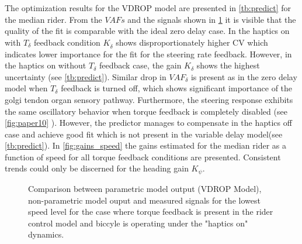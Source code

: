 The optimization results for the VDROP model are presented in \cref{tb:predict} for the median rider. From the \ensuremath{\mathit{VAF}s} and the signals shown in \cref{fig:ropm_raw} it is visible that the quality of the fit is comparable with the ideal zero delay case. In the haptics on with \ensuremath{{T_\delta}} feedback condition \ensuremath{K_{\dot{\delta}}} shows disproportionately higher CV which indicates lower importance for the fit for the steering rate feedback. However, in the haptics on without \ensuremath{ {T_\delta}} feedback case, the gain \ensuremath{K_{\delta}} shows the highest  uncertainty (see \cref{tb:predict}). Similar drop in \ensuremath{\mathit{VAF}_\delta} is present as in the zero delay model when  \ensuremath{{T_\delta}} feedback is turned off, which shows significant importance of the golgi tendon organ sensory pathway. Furthermore, the steering response exhibits  the same oscillatory behavior when torque feedback is completely disabled (see \cref{fig:paper10} ). However, the predictor manages to compensate in the haptics off case and achieve good fit which is not present in the variable delay model(see \cref{tb:predict}). In \cref{fig:gains_speed} the gains estimated for the median rider as a function of speed for all torque feedback conditions are presented. Consistent trends could only be discerned for the heading  gain \ensuremath{K_\psi}.

\begin{figure}[!h]
    \centering
        \centering
        \caption{Comparison between parametric model output (VDROP Model), non-parametric model ouput and measured signals for the lowest speed level for the case where torque feedback is present in the rider control model and biccyle is operating under the "haptics on" dynamics.}        \label{fig:ropm_raw}  
 \end{figure}



